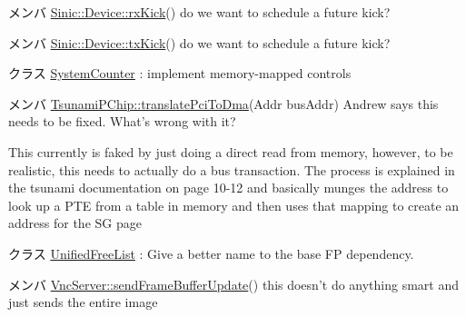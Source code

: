 \label{todo__todo000071}
\hypertarget{todo__todo000071}{}
 
\begin{DoxyDescription}
\item[メンバ \hyperlink{classSinic_1_1Device_a5fa946a73db6f59c9819d457c991486a}{Sinic::Device::rxKick}() ]do we want to schedule a future kick? 
\end{DoxyDescription}

\label{todo__todo000072}
\hypertarget{todo__todo000072}{}
 
\begin{DoxyDescription}
\item[メンバ \hyperlink{classSinic_1_1Device_ac5484e8debdd6a2d3cf4c2902b832a76}{Sinic::Device::txKick}() ]do we want to schedule a future kick? 
\end{DoxyDescription}

\label{todo__todo000052}
\hypertarget{todo__todo000052}{}
 
\begin{DoxyDescription}
\item[クラス \hyperlink{classGenericTimer_1_1SystemCounter}{SystemCounter} ]: implement memory-\/mapped controls 
\end{DoxyDescription}

\label{todo__todo000051}
\hypertarget{todo__todo000051}{}
 
\begin{DoxyDescription}
\item[メンバ \hyperlink{classTsunamiPChip_a5de3f8c8c47bf4bb58e072f54f4a7cba}{TsunamiPChip::translatePciToDma}(Addr busAddr) ]Andrew says this needs to be fixed. What's wrong with it? 

This currently is faked by just doing a direct read from memory, however, to be realistic, this needs to actually do a bus transaction. The process is explained in the tsunami documentation on page 10-\/12 and basically munges the address to look up a PTE from a table in memory and then uses that mapping to create an address for the SG page 
\end{DoxyDescription}

\label{todo__todo000029}
\hypertarget{todo__todo000029}{}
 
\begin{DoxyDescription}
\item[クラス \hyperlink{classUnifiedFreeList}{UnifiedFreeList} ]: Give a better name to the base FP dependency. 
\end{DoxyDescription}

\label{todo__todo000011}
\hypertarget{todo__todo000011}{}
 
\begin{DoxyDescription}
\item[メンバ \hyperlink{classVncServer_a12fdf8396c8fe33bb93e66d7491fb497}{VncServer::sendFrameBufferUpdate}() ]this doesn't do anything smart and just sends the entire image 
\end{DoxyDescription}